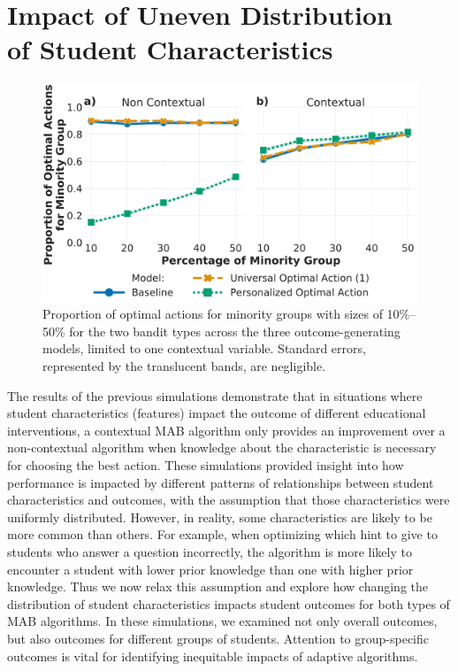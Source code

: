 \section{Impact of Uneven Distribution\\ of Student Characteristics} %

\begin{figure}[t]
    \centering
    \includegraphics[width=\columnwidth]{figs/MinGrpSize.pdf}
    \caption{Proportion of optimal actions for minority groups with sizes of 10\%--50\% for the two bandit types across the three outcome-generating models, limited to one contextual variable. Standard errors, represented by the translucent bands, are negligible.}
    \label{fig:MinGrpSize1ConVar}
\end{figure}


The results of the previous simulations demonstrate that in situations where student characteristics (features) impact the outcome of different educational interventions, a contextual MAB algorithm only provides an improvement over a non-contextual algorithm when knowledge about the characteristic is necessary for choosing the best action. These simulations provided insight into how performance is impacted by different patterns of relationships between student characteristics and outcomes, with the assumption that those characteristics were uniformly distributed. However, in reality, some characteristics are likely to be more common than others. For example, when optimizing which hint to give to students who answer a question incorrectly, the algorithm is more likely to encounter a student with lower prior knowledge than one with higher prior knowledge.
Thus we now relax this assumption and explore how changing the distribution of student characteristics impacts student outcomes for both types of MAB algorithms. In these simulations, we examined not only overall outcomes, but also outcomes for different groups of students. Attention to group-specific outcomes is vital for identifying inequitable impacts of adaptive algorithms. %


